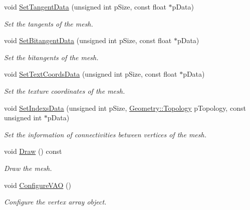 \begin{DoxyCompactItemize}
void \hyperlink{class_g_p_u_geometry_af1424a2416716c4b0f1cd49e7d771c46}{Set\+Tangent\+Data} (unsigned int p\+Size, const float $\ast$p\+Data)
\begin{DoxyCompactList}\small\item\em Set the tangents of the mesh. \end{DoxyCompactList}\item 
void \hyperlink{class_g_p_u_geometry_a0f7c708dd60f575de100c08aa4fdb19a}{Set\+Bitangent\+Data} (unsigned int p\+Size, const float $\ast$p\+Data)
\begin{DoxyCompactList}\small\item\em Set the bitangents of the mesh. \end{DoxyCompactList}\item 
void \hyperlink{class_g_p_u_geometry_a2a6090698e67e390f3629ec169f45bc5}{Set\+Text\+Coords\+Data} (unsigned int p\+Size, const float $\ast$p\+Data)
\begin{DoxyCompactList}\small\item\em Set the texture coordinates of the mesh. \end{DoxyCompactList}\item 
void \hyperlink{class_g_p_u_geometry_ace267349b9bd22f4131b7635c8b5aa15}{Set\+Indexs\+Data} (unsigned int p\+Size, \hyperlink{class_geometry_af0136a3b268286ee5921cc6af5239293}{Geometry\+::\+Topology} p\+Topology, const unsigned int $\ast$p\+Data)
\begin{DoxyCompactList}\small\item\em Set the information of connectivities between vertices of the mesh. \end{DoxyCompactList}\item 
void \hyperlink{class_g_p_u_geometry_a5b53ace39a31fcd7694465903a7239fa}{Draw} () const 
\begin{DoxyCompactList}\small\item\em Draw the mesh. \end{DoxyCompactList}\item 
void \hyperlink{class_g_p_u_geometry_a7d1bee6693d669184dbb7c5e06f8d8a9}{Configure\+V\+A\+O} ()
\begin{DoxyCompactList}\small\item\em Configure the vertex array object. \end{DoxyCompactList}\end{DoxyCompactItemize}
